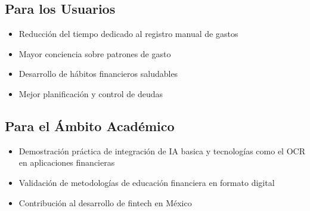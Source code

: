 \subsection{Para los Usuarios}
\begin{itemize}
    \item Reducción del tiempo dedicado al registro manual de gastos
    \item Mayor conciencia sobre patrones de gasto
    \item Desarrollo de hábitos financieros saludables
    \item Mejor planificación y control de deudas
\end{itemize}

\subsection{Para el Ámbito Académico}
\begin{itemize}
    \item Demostración práctica de integración de IA basica y tecnologías como el OCR en aplicaciones financieras
    \item Validación de metodologías de educación financiera en formato digital
    \item Contribución al desarrollo de fintech en México
\end{itemize}